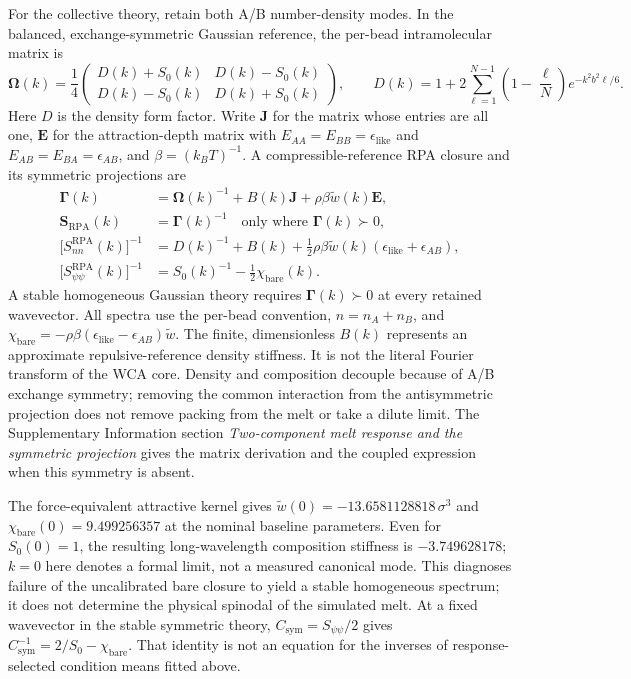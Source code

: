 \documentclass[pdflatex,sn-nature,onecolumn]{sn-jnl}
\begin{document}
For the collective theory, retain both A/B number-density modes. In the balanced, exchange-symmetric Gaussian reference, the per-bead intramolecular matrix is
\[
\boldsymbol\Omega(k)=\frac14
\begin{pmatrix}D(k)+S_0(k)&D(k)-S_0(k)\\D(k)-S_0(k)&D(k)+S_0(k)\end{pmatrix},
\qquad
D(k)=1+2\sum_{\ell=1}^{N-1}\left(1-\frac\ell N\right)e^{-k^2b^2\ell/6}.
\]
Here $D$ is the density form factor. Write $\mathbf J$ for the matrix whose entries are all one, $\mathbf E$ for the attraction-depth matrix with $E_{AA}=E_{BB}=\epsilon_{\mathrm{like}}$ and $E_{AB}=E_{BA}=\epsilon_{AB}$, and $\beta=(k_BT)^{-1}$. A compressible-reference RPA closure and its symmetric projections are
\begin{equation}
\begin{aligned}
\boldsymbol\Gamma(k)&=\boldsymbol\Omega(k)^{-1}+B(k)\mathbf J
 +\rho\beta\widetilde w(k)\mathbf E,\\
\mathbf S_{\mathrm{RPA}}(k)&=\boldsymbol\Gamma(k)^{-1}
 \quad\text{only where }\boldsymbol\Gamma(k)\succ0,\\
\bigl[S_{nn}^{\mathrm{RPA}}(k)\bigr]^{-1}
 &=D(k)^{-1}+B(k)+\tfrac12\rho\beta\widetilde w(k)
 (\epsilon_{\mathrm{like}}+\epsilon_{AB}),\\
\bigl[S_{\psi\psi}^{\mathrm{RPA}}(k)\bigr]^{-1}
 &=S_0(k)^{-1}-\tfrac12\chi_{\mathrm{bare}}(k).
\end{aligned}
\label{eq:rpa}
\end{equation}
A stable homogeneous Gaussian theory requires $\boldsymbol\Gamma(k)\succ0$ at every retained wavevector. All spectra use the per-bead convention, $n=n_A+n_B$, and $\chi_{\mathrm{bare}}=-\rho\beta(\epsilon_{\mathrm{like}}-\epsilon_{AB})\widetilde w$. The finite, dimensionless $B(k)$ represents an approximate repulsive-reference density stiffness. It is not the literal Fourier transform of the WCA core. Density and composition decouple because of A/B exchange symmetry; removing the common interaction from the antisymmetric projection does not remove packing from the melt or take a dilute limit. The Supplementary Information section \emph{Two-component melt response and the symmetric projection} gives the matrix derivation and the coupled expression when this symmetry is absent.

The force-equivalent attractive kernel gives $\widetilde w(0)=-13.6581128818\,\sigma^3$ and $\chi_{\mathrm{bare}}(0)=9.499256357$ at the nominal baseline parameters. Even for $S_0(0)=1$, the resulting long-wavelength composition stiffness is $-3.749628178$; $k=0$ here denotes a formal limit, not a measured canonical mode. This diagnoses failure of the uncalibrated bare closure to yield a stable homogeneous spectrum; it does not determine the physical spinodal of the simulated melt. At a fixed wavevector in the stable symmetric theory, $C_{\mathrm{sym}}=S_{\psi\psi}/2$ gives $C_{\mathrm{sym}}^{-1}=2/S_0-\chi_{\mathrm{bare}}$. That identity is not an equation for the inverses of response-selected condition means fitted above.
\end{document}
